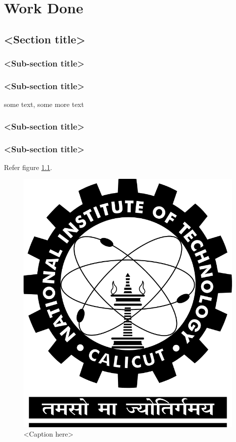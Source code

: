 \chapter{Work Done}

\section{<Section title>}

\subsection{<Sub-section title>}

\subsection{<Sub-section title>}
some text\cite{citation-2-name-here}, some more text
\subsection{<Sub-section title>}

\subsection{<Sub-section title>}

Refer figure \ref{fig:label}.

\begin{figure}[htb]
\centering
\includegraphics[scale=0.3]{./nitc-logo} %
\caption{<Caption here>}
\label{fig:label} %
\end{figure}

